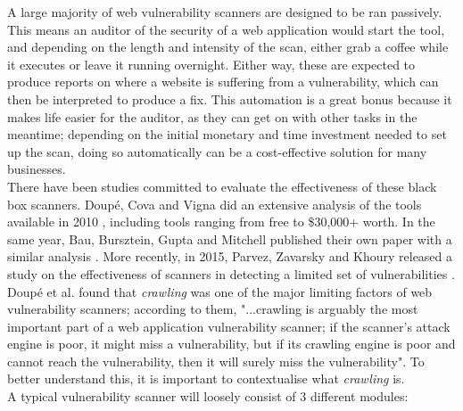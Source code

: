 A large majority of web vulnerability scanners are designed to be ran passively. This means an auditor of the security of a web application would start the tool, and depending on the length and intensity of the scan, either grab a coffee while it executes or leave it running overnight. Either way, these are expected to produce reports on where a website is suffering from a vulnerability, which can then be interpreted to produce a fix. This automation is a great bonus because it makes life easier for the auditor, as they can get on with other tasks in the meantime; depending on the initial monetary and time investment needed to set up the scan, doing so automatically can be a cost-effective solution for many businesses. \\

There have been studies committed to evaluate the effectiveness of these black box scanners. Doup\'e, Cova and Vigna did an extensive analysis of the tools available in 2010 \cite{whyJohnnyCantPentest}, including tools ranging from free to \$30,000+ worth. In the same year, Bau, Bursztein, Gupta and Mitchell published their own paper with a similar analysis \cite{stateOfArtAutomatedBlackBoxWebAppVulnTesting}. More recently, in 2015, Parvez, Zavarsky and Khoury released a study on the effectiveness of scanners in detecting a limited set of vulnerabilities \cite{analysisOfEffectivenessOfBlackBoxWebAppScannersStoredSQLStoredXSS}. \\

Doup\'e et al. found that \textit{crawling} was one of the major limiting factors of web vulnerability scanners; according to them, {"...crawling is arguably the most important part of a web application vulnerability scanner; if the scanner’s attack engine is poor, it might miss a vulnerability, but if its crawling engine is poor and cannot reach the vulnerability, then it will surely miss the vulnerability"}. To better understand this, it is important to contextualise what \textit{crawling} is. \\

A typical vulnerability scanner will loosely consist of 3 different modules:

